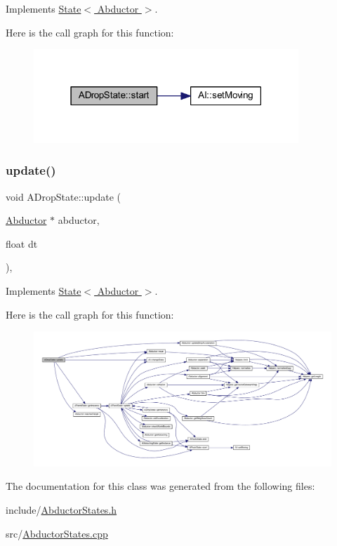 Implements \hyperlink{class_state_abc29d36b0462a306ac9b32f36571d783}{State$<$ Abductor $>$}.

Here is the call graph for this function\+:
\nopagebreak
\begin{figure}[H]
\begin{center}
\leavevmode
\includegraphics[width=283pt]{class_a_drop_state_ab41abe3006ca9d4dec5e93a800a03e01_cgraph}
\end{center}
\end{figure}
\mbox{\label{class_a_drop_state_a50ee2cafa31714ee14223e6cce007f08}} 
\subsubsection{\texorpdfstring{update()}{update()}}
{\footnotesize\ttfamily void A\+Drop\+State\+::update (\begin{DoxyParamCaption}\item[{\hyperlink{class_abductor}{Abductor} $\ast$}]{abductor,  }\item[{float}]{dt }\end{DoxyParamCaption})\hspace{0.3cm}{\ttfamily [override]}, {\ttfamily [virtual]}}



Implements \hyperlink{class_state_a30b5f87ed3e3a05fafeaf898e43518ea}{State$<$ Abductor $>$}.

Here is the call graph for this function\+:
\nopagebreak
\begin{figure}[H]
\begin{center}
\leavevmode
\includegraphics[width=350pt]{class_a_drop_state_a50ee2cafa31714ee14223e6cce007f08_cgraph}
\end{center}
\end{figure}


The documentation for this class was generated from the following files\+:\begin{DoxyCompactItemize}
\item 
include/\hyperlink{_abductor_states_8h}{Abductor\+States.\+h}\item 
src/\hyperlink{_abductor_states_8cpp}{Abductor\+States.\+cpp}\end{DoxyCompactItemize}
